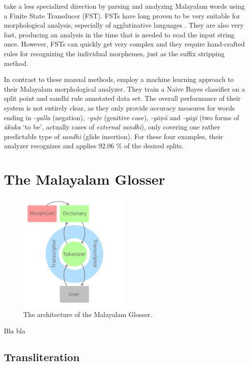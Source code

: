 \documentclass[a4paper]{article}
\begin{document}
\textcite{manju2009pos} take a less specialized direction by parsing and analyzing Malayalam words using a Finite State Transducer (FST). FSTs have long proven to be very suitable for morphological analysis, especially of agglutinative languages \parencite{fsm}. They are also very fast, producing an analysis in the time that is needed to read the input string once. However, FSTs can quickly get very complex and they require hand-crafted rules for recognizing the individual morphemes, just as the suffix stripping method.

In contrast to these manual methods, \textcite{sebastian2018morph} employ a machine learning approach to their Malayalam morphological analyzer. They train a Naive Bayes classifier on a split point and sandhi rule annotated data set. The overall performance of their system is not entirely clear, as they only provide accuracy measures for words ending in \textit{-yalla} (negation), \textit{-yuṭe} (genitive case), \textit{-yāṇŭ} and \textit{-yāyi} (two forms of \textit{ākuka} `to be', actually cases of \textit{external sandhi}), only covering one rather predictable type of \textit{sandhi} (glide insertion). For these four examples, their analyzer recognizes and applies 92.06 \% of the desired splits.

\section{The Malayalam Glosser}

\begin{figure}[t]
\centering
\includegraphics[width=0.5\textwidth]{systemarchitecture.png}
\caption{The architecture of the Malayalam Glosser.}
\label{architecture}
\end{figure}

Bla bla

\subsection{Transliteration}
\end{document}
